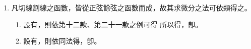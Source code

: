 \begin{enumerate} [label={第\chinese*款},nolistsep]
	凡正弦之微分，爲其弧微分與餘弦相乘之數；凡餘弦之微分，爲正弦變號與弧微分相乘之數，\textsuperscript{案：本當皆以半徑約之。因半徑之數恆爲一，故可省也。}故餘弦之微分爲負。\textsuperscript{其負號之故，因負則其弧}\\ \textsuperscript{每能增大，正則其弧每能減小，所以必用負號。此須記之。}\\
	餘弦之微分又有他術可求之，其所得之式與前無異，故可爲本法之證：\\
	如令亥爲正弦，地爲餘弦，則\CJKmove。如求其微分，得\CJKmove。惟因天爲其弧，\CJKmove，所以\CJKmove，而\CJKmove。
	\item 凡切線割線之函數，皆從正弦餘弦之函數而成，故其求微分之法可依類得之。
	\begin{enumerate} [label={\chinese*式}]
		\item 設有\CJKmove，則依第十二款、第二十一款之例可得
		\CJKmove
		所以得\CJKmove，卽\CJKmove。
		\item 設有\CJKmove，則依同法得\CJKmove，卽\CJKmove。
	\end{enumerate}

\end{enumerate}
